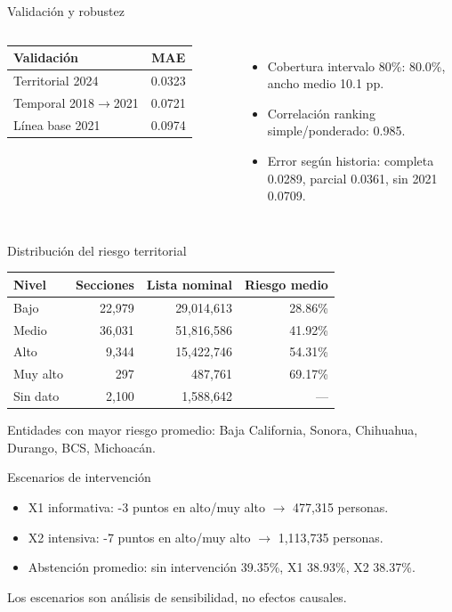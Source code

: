 \documentclass[aspectratio=169]{beamer}
\begin{document}
\begin{frame}{Validación y robustez}
\begin{columns}
\begin{tabular}{lc}
\toprule
Validación & MAE \\
\midrule
Territorial 2024 & 0.0323 \\
Temporal 2018$\rightarrow$2021 & 0.0721 \\
Línea base 2021 & 0.0974 \\
\bottomrule
\end{tabular}
\begin{itemize}
\item Cobertura intervalo 80\%: 80.0\%, ancho medio 10.1 pp.
\item Correlación ranking simple/ponderado: 0.985.
\item Error según historia: completa 0.0289, parcial 0.0361, sin 2021 0.0709.
\end{itemize}
\end{columns}
\end{frame}

\begin{frame}{Distribución del riesgo territorial}
\begin{center}
\begin{tabular}{lrrr}
\toprule
Nivel & Secciones & Lista nominal & Riesgo medio \\
\midrule
Bajo & 22,979 & 29,014,613 & 28.86\% \\
Medio & 36,031 & 51,816,586 & 41.92\% \\
Alto & 9,344 & 15,422,746 & 54.31\% \\
Muy alto & 297 & 487,761 & 69.17\% \\
Sin dato & 2,100 & 1,588,642 & — \\
\bottomrule
\end{tabular}
\end{center}
Entidades con mayor riesgo promedio: Baja California, Sonora, Chihuahua, Durango, BCS, Michoacán.
\end{frame}

\begin{frame}{Escenarios de intervención}
\begin{itemize}
\item X1 informativa: -3 puntos en alto/muy alto $\rightarrow$ 477,315 personas.
\item X2 intensiva: -7 puntos en alto/muy alto $\rightarrow$ 1,113,735 personas.
\item Abstención promedio: sin intervención 39.35\%, X1 38.93\%, X2 38.37\%.
\end{itemize}
Los escenarios son análisis de sensibilidad, no efectos causales.
\end{frame}
\end{document}
